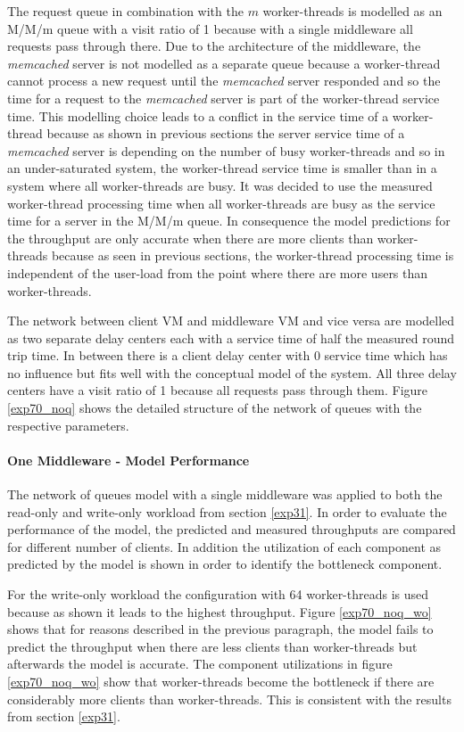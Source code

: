 \documentclass[report.tex]{subfiles}
\begin{document}
The request queue in combination with the $m$ worker-threads is modelled as an M/M/m queue with a visit ratio of 1 because with a single middleware all requests pass through there. Due to the architecture of the middleware, the \emph{memcached} server is not modelled as a separate queue because a worker-thread cannot process a new request until the \emph{memcached} server responded and so the time for a request to the \emph{memcached} server is part of the worker-thread service time. This modelling choice leads to a conflict in the service time of a worker-thread because as shown in previous sections the server service time of a \emph{memcached} server is depending on the number of busy worker-threads and so in an under-saturated system, the worker-thread service time is smaller than in a system where all worker-threads are busy. 
It was decided to use the measured worker-thread processing time when all worker-threads are busy as the service time for a server in the M/M/m queue. In consequence the model predictions for the throughput are only accurate when there are more clients than worker-threads because as seen in previous sections, the worker-thread processing time is independent of the user-load from the point where there are more users than worker-threads.

The network between client VM and middleware VM and vice versa are modelled as two separate delay centers each with a service time of half the measured round trip time. In between there is a client delay center with 0 service time which has no influence but fits well with the conceptual model of the system. All three delay centers have a visit ratio of 1 because all requests pass through them.
Figure \ref{exp70_noq} shows the detailed structure of the network of queues with the respective parameters.

\paragraph{One Middleware - Model Performance}
The network of queues model with a single middleware was applied to both the read-only and write-only workload from section \ref{exp31}.
In order to evaluate the performance of the model, the predicted and measured throughputs are compared for different number of clients.
In addition the utilization of each component as predicted by the model is shown in order to identify the bottleneck component.

For the write-only workload the configuration with 64 worker-threads is used because as shown it leads to the highest throughput.
Figure \ref{exp70_noq_wo} shows that for reasons described in the previous paragraph, the model fails to predict the throughput when there are less clients than worker-threads but afterwards the model is accurate. The component utilizations in figure \ref{exp70_noq_wo} show that worker-threads become the bottleneck if there are considerably more clients than worker-threads. This is consistent with the results from section \ref{exp31}.
\end{document}
